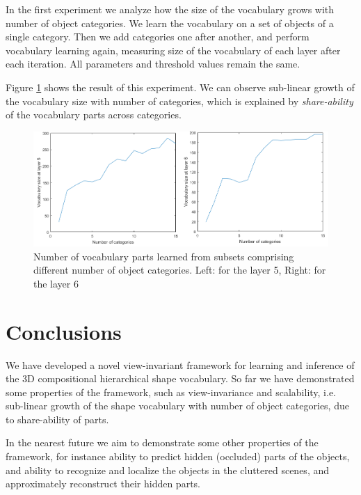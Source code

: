 \documentclass[conference]{IEEEtran}
\begin{document}
{In the first experiment we analyze how the size of the vocabulary
grows with number of object categories. We learn the vocabulary on a
set of objects of a single category. Then we add categories one
after another, and perform vocabulary learning again, measuring size
of the vocabulary of each layer after each iteration. All parameters
and threshold values remain the same.

Figure \ref{fig:scalability} shows the result of this experiment. We
can observe sub-linear growth of the vocabulary size with number of
categories, which is explained by \emph{share-ability} of the
vocabulary parts across categories.

\begin{figure}[t!]
\centering
\includegraphics[scale=0.4]{scalability}
\caption{Number of vocabulary parts learned from subsets comprising
different number of object categories. Left: for the layer 5, Right:
for the layer 6} \label{fig:scalability}
\end{figure}

\section{Conclusions \label{sec:Conclusion}}

We have developed a novel view-invariant framework for learning and
inference of the 3D compositional hierarchical shape vocabulary. So
far we have demonstrated some properties of the framework, such as
view-invariance and scalability, i.e. sub-linear growth of the shape
vocabulary with number of object categories, due to share-ability of
parts.

In the nearest future we aim to demonstrate some other properties of
the framework, for instance ability to predict hidden (occluded)
parts of the objects, and ability to recognize and localize the
objects in the cluttered scenes, and approximately reconstruct their
hidden parts.




}
\end{document}
